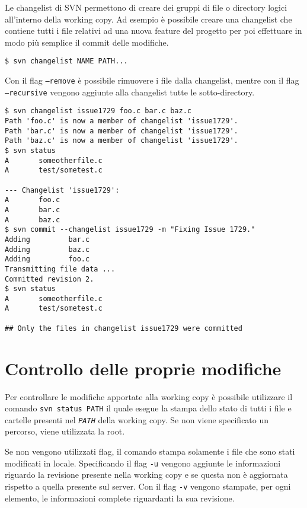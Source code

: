 Le changelist di SVN permettono di creare dei gruppi di file o directory logici all'interno della working copy. Ad esempio è possibile creare una changelist che contiene tutti i file relativi ad una nuova feature del progetto per poi effettuare in modo più semplice il commit delle modifiche.

\begin{lstlisting}
$ svn changelist NAME PATH...
\end{lstlisting}

Con il flag \texttt{--remove} è possibile rimuovere i file dalla changelist, mentre con il flag \texttt{--recursive} vengono aggiunte alla changelist tutte le sotto-directory.

\begin{verbatim}
$ svn changelist issue1729 foo.c bar.c baz.c
Path 'foo.c' is now a member of changelist 'issue1729'.
Path 'bar.c' is now a member of changelist 'issue1729'.
Path 'baz.c' is now a member of changelist 'issue1729'.
$ svn status
A       someotherfile.c
A       test/sometest.c

--- Changelist 'issue1729':
A       foo.c
A       bar.c
A       baz.c
$ svn commit --changelist issue1729 -m "Fixing Issue 1729."
Adding         bar.c
Adding         baz.c
Adding         foo.c
Transmitting file data ...
Committed revision 2.
$ svn status
A       someotherfile.c
A       test/sometest.c

## Only the files in changelist issue1729 were committed
\end{verbatim}

\section{Controllo delle proprie modifiche}

Per controllare le modifiche apportate alla working copy è possibile utilizzare il comando \texttt{svn status PATH} il quale esegue la stampa dello stato di tutti i file e cartelle presenti nel \textit{\texttt{PATH}} della working copy. Se non viene specificato un percorso, viene utilizzata la root.

Se non vengono utilizzati flag, il comando stampa solamente i file che sono stati modificati in locale. Specificando il flag \texttt{-u} vengono aggiunte le informazioni riguardo la revisione presente nella working copy e se questa non è aggiornata rispetto a quella presente sul server. Con il flag \texttt{-v} vengono stampate, per ogni elemento, le informazioni complete riguardanti la sua revisione.

